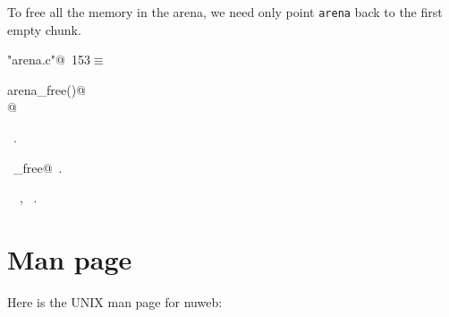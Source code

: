 \documentclass[a4paper]{report}
\begin{document}
To free all the memory in the arena, we need only point \verb|arena|
back to the first empty chunk.
\begin{flushleft} \small
\begin{minipage}{\linewidth}\label{scrap343}\raggedright\small
{} \verb@"arena.c"@\nobreak\ {\footnotesize {153}}$\equiv$
\vspace{-1ex}
\begin{list}{}{} \item
\mbox{}\verb@void arena_free()@\\
\mbox{}@\\
\mbox{}\verb@@{\NWsep}
\end{list}
\vspace{-1.5ex}
\footnotesize
\begin{list}{}{\setlength{\itemsep}{-\parsep}\setlength{\itemindent}{-\leftmargin}}
\item \NWtxtFileDefBy\ .
\item \NWtxtIdentsDefed\nobreak\  \verb@arena_free@\nobreak\ .\item \NWtxtIdentsUsed\nobreak\  \verb@arena@\nobreak\ , \verb@first@\nobreak\ .
\item{}
\end{list}
\end{minipage}\vspace{4ex}
\end{flushleft}
\chapter{Man page}

Here is the UNIX man page for nuweb:
\end{document}
